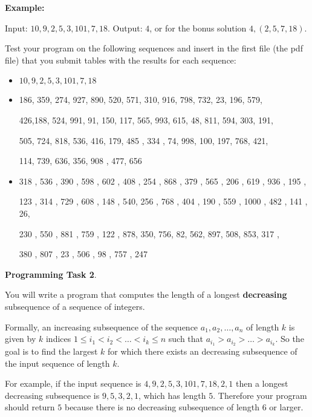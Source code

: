 \documentclass[11pt]{article}
\begin{document}
\textbf{Example:}

Input: $10,9,2,5,3,101,7, 18$.
Output: $4$,  or for the bonus solution $4, (2,5,7,18)$.
\smallskip

Test your program on the following sequences and insert in the first file (the pdf file)  that you submit  tables with  the results for each sequence:

\begin{itemize}
\item $10,9,2,5,3,101, 7, 18$
\item 186, 359, 274,  927,  890,  520,  571,  310,  916,  798,  732,  23, 196, 579, 

426,188,  524,  991,   91,  150,  117,  565,  993,  615,   48, 811,  594,  303,  191,  

505,  724,  818,  536,  416,  179,  485 , 334  , 74,  998,  100,  197,  768,  421,  

114,  739,  636,  356,  908 , 477,  656
\item 318 ,  536  , 390  , 598  , 602 ,  408  , 254  , 868 ,  379  , 565  ,  206  ,  619  ,  936  ,  195 ,  

 123  ,  314  ,  729 ,  608  , 148 ,  540,   256 ,  768 ,  404  ,  190  ,  559 ,  1000 ,   482  ,  141 ,  26,   
 
  230  ,  550  ,  881  ,  759  ,  122 ,   878,    350,    756,     82,    562,    897,    508,    853,    317 ,   
  
  380 ,   807 ,    23 ,   506  ,   98 ,   757 ,   247
\end{itemize}


\newpage
\textbf{Programming Task 2}. 

You will write a program that computes the length of a longest \textbf{decreasing} subsequence of a sequence of integers. 

Formally, an increasing subsequence of the sequence $a_1, a_2, \ldots, a_n$ of length $k$ is given by $k$ indices $1 \leq i_1 < i_2 < \ldots < i_k \leq n$ such that $a_{i_1} > a_{i_2} > \ldots > a_{i_k}$. So the goal is to find the largest $k$ for which there exists an decreasing subsequence of the input sequence of length $k$. 

For example, if the input sequence is $4, 9, 2, 5, 3, 101, 7, 18, 2,1$ then a longest decreasing subsequence is $9,5,3,2,1$, which has length $5$. Therefore your program should return $5$ because there is no decreasing subsequence of length $6$ or larger.
\end{document}
